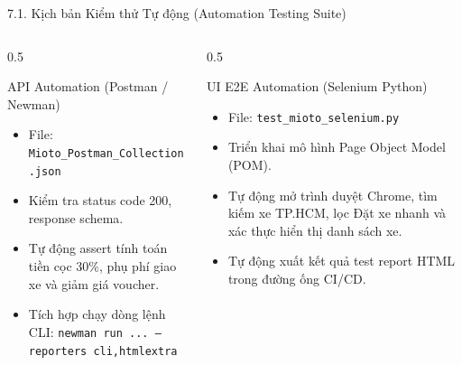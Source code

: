 \documentclass[aspectratio=169,10pt]{beamer}
\begin{document}
\begin{frame}{7.1. Kịch bản Kiểm thử Tự động (Automation Testing Suite)}
  \begin{columns}
    \begin{column}{0.5\textwidth}
      \begin{block}{API Automation (Postman / Newman)}
        \begin{itemize}
          \item File: \texttt{Mioto\_Postman\_Collection.json}
          \item Kiểm tra status code 200, response schema.
          \item Tự động assert tính toán tiền cọc 30\%, phụ phí giao xe và giảm giá voucher.
          \item Tích hợp chạy dòng lệnh CLI:
            \texttt{newman run ... --reporters cli,htmlextra}
        \end{itemize}
      \end{block}
    \end{column}
    \begin{column}{0.5\textwidth}
      \begin{block}{UI E2E Automation (Selenium Python)}
        \begin{itemize}
          \item File: \texttt{test\_mioto\_selenium.py}
          \item Triển khai mô hình Page Object Model (POM).
          \item Tự động mở trình duyệt Chrome, tìm kiếm xe TP.HCM, lọc Đặt xe nhanh và xác thực hiển thị danh sách xe.
          \item Tự động xuất kết quả test report HTML trong đường ống CI/CD.
        \end{itemize}
      \end{block}
    \end{column}
  \end{columns}
\end{frame}
\end{document}
